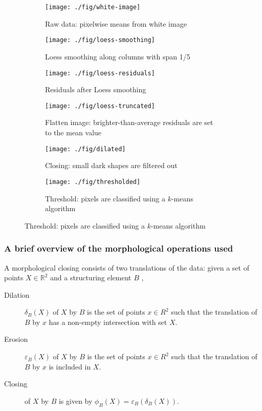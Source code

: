 \documentclass[10pt,fleqn]{article}
\begin{document}
\begin{figure}[!h]
\caption{Stages in identification of spots on beryllium screen}
\centering

\captionsetup[subfigure]{position=t}

\begin{subfigure}[t]{0.32\textwidth}
\caption{Raw data: pixelwise means from white image}
\texttt{[image: ./fig/white-image]}
\end{subfigure}
%
\begin{subfigure}[t]{0.32\textwidth}
\caption{Loess smoothing along columns with span 1/5}
\texttt{[image: ./fig/loess-smoothing]}
\end{subfigure}
%
\begin{subfigure}[t]{0.32\textwidth}
\caption{Residuals after Loess smoothing}
\texttt{[image: ./fig/loess-residuals]}
\end{subfigure}
%
\begin{subfigure}[t]{0.32\textwidth}
\caption{Flatten image: brighter-than-average residuals are set to the mean value}
\texttt{[image: ./fig/loess-truncated]}
\end{subfigure}
%
\begin{subfigure}[t]{0.32\textwidth}
\caption{Closing: small dark shapes are filtered out}
\texttt{[image: ./fig/dilated]}
\end{subfigure}
%
\begin{subfigure}[t]{0.32\textwidth}
\caption{Threshold: pixels are classified using a $k$-means algorithm}
\texttt{[image: ./fig/thresholded]}
\end{subfigure}
\end{figure}

\subsubsection*{A brief overview of the morphological operations used}
A morphological closing consists of two translations of the data: given a set of points $X \in \mathbb{R}^2$ and a structuring element $B$ \cite{Vincent1997},

\begin{description}
\item[Dilation] $\delta_B(X)$ of $X$ by $B$ is the set of points $x \in R^2$ such that the translation of $B$ by $x$ has a non-empty intersection with set $X$.
\item[Erosion] $\varepsilon_B(X)$ of $X$ by $B$ is the set of points $x \in R^2$ such that the translation of $B$ by $x$ is included in $X$.
\item[Closing] of $X$ by $B$ is given by $\phi_B(X) = \varepsilon_B(\delta_B(X))$.
\end{description}
\end{document}
